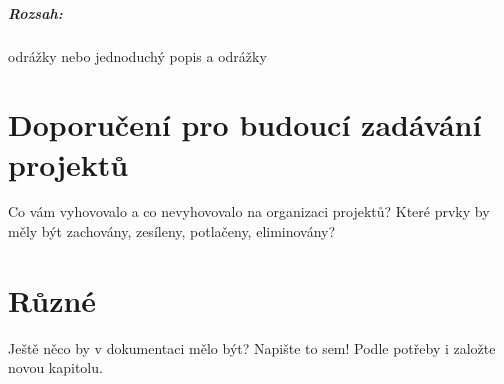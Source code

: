 \documentclass[12pt,a4paper,titlepage,final]{report}
\begin{document}
\paragraph{Rozsah:} odrážky nebo jednoduchý popis a odrážky


\chapter{Doporučení pro budoucí zadávání projektů}

Co vám vyhovovalo a co nevyhovovalo na organizaci projektů? Které prvky by měly být zachovány, zesíleny, potlačeny, eliminovány?


\chapter{Různé}

Ještě něco by v dokumentaci mělo být? Napište to sem! Podle potřeby i založte
novou kapitolu.




\nocite{cite1}
\nocite{cite2}
\nocite{cite3}


\end{document}
